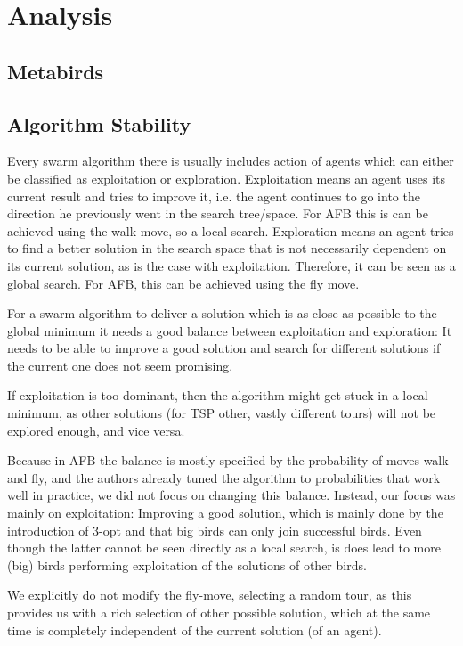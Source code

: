 \section{Analysis}
\subsection{Metabirds}
\subsection{Algorithm Stability}
Every swarm algorithm there is usually includes action of agents which can either be classified as exploitation or exploration.
Exploitation means an agent uses its current result and tries to improve it, i.e. the agent continues to go into the direction he previously went in the search tree/space.
For AFB this is can be achieved using the walk move, so a local search.
Exploration means an agent tries to find a better solution in the search space that is not necessarily dependent on its current solution, as is the case with exploitation. Therefore, it can be seen as a global search. For AFB, this can be achieved using the fly move.


For a swarm algorithm to deliver a solution which is as close as possible to the global minimum it needs a good balance between exploitation and exploration: It needs to be able to improve a good solution and search for different solutions if the current one does not seem promising.

If exploitation is too dominant, then the algorithm might get stuck in a local minimum, as other solutions (for TSP other, vastly different tours) will not be explored enough, and vice versa.


Because in AFB the balance is mostly specified by the probability of moves walk and fly, and the authors already tuned the algorithm to probabilities that work well in practice, we did not focus on changing this balance.
Instead, our focus was mainly on exploitation: Improving a good solution, which is mainly done by the introduction of 3-opt and that big birds can only join successful birds. Even though the latter cannot be seen directly as a local search, is does lead to more (big) birds performing exploitation of the solutions of other birds.


We explicitly do not modify the fly-move, selecting a random tour, as this provides us with a rich selection of other possible solution, which at the same time is completely independent of the current solution (of an agent).

